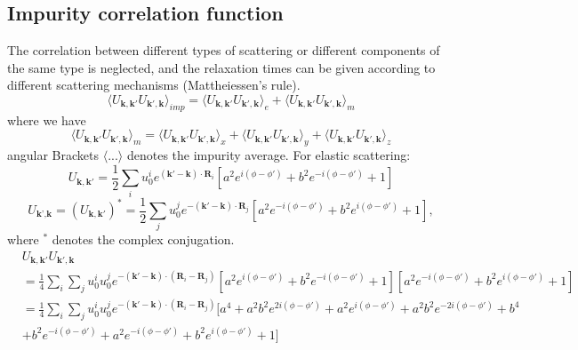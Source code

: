 \documentclass[aps,prb,amsmath,amssymb,footinbib,showpacs,twocolumn]{revtex4-2}
\begin{document}
\begin{widetext}
\subsection{Impurity correlation function }
The correlation between different types of scattering or different components of the same type is neglected, and the relaxation times can be given according to different scattering mechanisms (Mattheiessen's rule).
\begin{equation}
    \bigr \langle U_{\textbf{k},\textbf{k}'}U_{\textbf{k}',\textbf{k}}\bigl \rangle_{imp}=\bigr \langle U_{\textbf{k},\textbf{k}'}U_{\textbf{k}',\textbf{k}}\bigl \rangle_{e}+\bigr \langle U_{\textbf{k},\textbf{k}'}U_{\textbf{k}',\textbf{k}}\bigl \rangle_{m}
\end{equation}
where we have
\begin{equation}
    \bigr \langle U_{\textbf{k},\textbf{k}'}U_{\textbf{k}',\textbf{k}}\bigl \rangle_{m}=\bigr \langle U_{\textbf{k},\textbf{k}'}U_{\textbf{k}',\textbf{k}}\bigl \rangle_{x}+\bigr \langle U_{\textbf{k},\textbf{k}'}U_{\textbf{k}',\textbf{k}}\bigl \rangle_{y}+\bigr \langle U_{\textbf{k},\textbf{k}'}U_{\textbf{k}',\textbf{k}}\bigl \rangle_{z}
\end{equation}
angular Brackets $ \bigr \langle...\bigl \rangle$ denotes the impurity average.
For elastic scattering:
\begin{equation}
    U_{\textbf{k},\textbf{k}'} = \frac{1}{2}\sum_{i}u^{i}_{0}e^{(\textbf{k}'-\textbf{k})\cdot\textbf{R}_{i}}\left[a^{2}e^{i(\phi-\phi')}+ b^{2}e^{-i(\phi-\phi')}+1\right]
    \end{equation}
\begin{equation}
     U_{\textbf{k'},\textbf{k}}=( U_{\textbf{k},\textbf{k}'})^{*}= \frac{1}{2}\sum_{j}u^{j}_{0}e^{-(\textbf{k}'-\textbf{k})\cdot\textbf{R}_{j}}\left[a^{2}e^{-i(\phi-\phi')}+ b^{2}e^{i(\phi-\phi')}+1\right],
\end{equation}
where $^*$ denotes the complex conjugation.
\begin{align}
   &U_{\textbf{k},\textbf{k}'}  U_{\textbf{k}',\textbf{k}} \nonumber\\&=
   \frac{1}{4}\sum_{i}\sum_{j}u^{i}_{0}u^{j}_{0}e^{-(\textbf{k}'-\textbf{k})\cdot(\textbf{R}_{i}-\textbf{R}_{j})}\left[a^{2}e^{i(\phi-\phi')}+ b^{2}e^{-i(\phi-\phi')}+1\right] \left[a^{2}e^{-i(\phi-\phi')}+ b^{2}e^{i(\phi-\phi')}+1\right] \nonumber \\
   &=
   \frac{1}{4}\sum_{i}\sum_{j}u^{i}_{0}u^{j}_{0}e^{-(\textbf{k}'-\textbf{k})\cdot(\textbf{R}_{i}-\textbf{R}_{j})} [a^{4}+a^{2}b^{2}e^{2i(\phi-\phi')}+a^{2}e^{i(\phi-\phi')}+a^{2}b^{2}e^{-2i(\phi-\phi')}+b^{4}\nonumber\\ &+b^{2}e^{-i(\phi-\phi')}+a^{2}e^{-i(\phi-\phi')}+b^{2}e^{i(\phi-\phi')}+1]\nonumber\\

\end{align}
\end{widetext}
\end{document}
